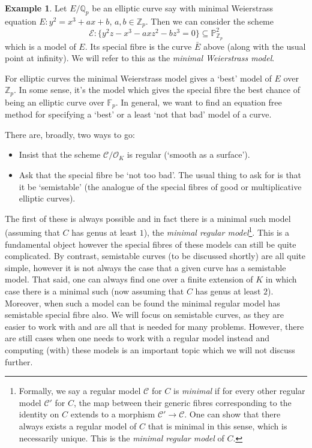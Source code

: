 \documentclass[12pt]{amsart}
\numberwithin{equation}{section}
\theoremstyle{remark}
\theoremstyle{definition}
\newtheorem{example}[equation]{Example}
\theoremstyle{definition}
\theoremstyle{definition}
\theoremstyle{definition}
\theoremstyle{definition}
\theoremstyle{definition}
\begin{document}
\begin{example}
Let $E/\mathbb{Q}_p$ be an elliptic curve say with minimal Weierstrass equation $E:y^2=x^3+ax+b$, $a,b\in \mathbb{Z}_p$. Then we can consider the scheme
\[\mathcal{E}:\{y^2z-x^3-axz^2-bz^3=0\}\subseteq \mathbb{P}^2_{\mathbb{Z}_p}\]
which is a model of $E$. Its special fibre is the curve $\bar{E}$ above (along with the usual point at infinity). We will refer to this as the \textit{minimal Weierstrass model}. 
\end{example}

For elliptic curves the minimal Weierstrass model gives a `best' model of $E$ over $\mathbb{Z}_p$. In some sense, it's the model which gives the special fibre the best chance of being an elliptic curve over $\mathbb{F}_p$. In general, we want to find an equation free method for specifying a `best' or a least `not that bad' model of a curve. 

There are, broadly, two ways to go:

\begin{itemize}
\item Insist that the scheme $\mathcal{C}/\mathcal{O}_K$ is regular (`smooth as a surface').
\item Ask that the special fibre be `not too bad'. The usual thing to ask for is that it be `semistable' (the analogue of the special fibres of good or multiplicative elliptic curves).
\end{itemize}

The first of these is always possible and in fact there is a minimal such model (assuming that $C$ has genus at least $1$), the \textit{minimal regular model}\footnote{Formally, we say a regular model $\mathcal{C}$ for $C$ is \textit{minimal} if for every other regular model $\mathcal{C}'$ for $C$, the map between their generic fibres corresponding to the identity  on $C$ extends to a morphism $\mathcal{C}'\rightarrow \mathcal{C}$. One can show that there always exists a regular model of $C$ that is minimal in this sense, which is necessarily unique. This is the \textit{minimal regular model} of $C$.}. This is a fundamental object however the special fibres of these models can still be quite complicated. By contrast, semistable curves (to be discussed shortly) are all quite simple, however it is not always the case that a given curve has a semistable model. That said,  one can always find one over a finite extension of $K$ in which case there is a minimal such (now assuming that $C$ has genus at least $2$). Moreover, when such a model can be found the minimal regular model has semistable special fibre also. We will focus on semistable curves, as they are easier to work with and are all that is needed for many problems. However, there are still cases when one needs to work with a regular model instead and computing (with) these models is an important topic which we will not discuss further.
\end{document}
